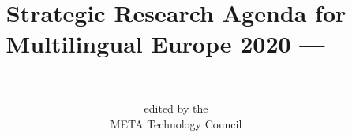 %
%
%
% 

\usepackage{polyglossia}

\title{Strategic Research Agenda for Multilingual Europe 2020 --- ~}


\subtitle{~ --- ~}

\author{
  {\footnotesize edited by the}\\
  META Technology Council
}


\editors{
}

\SpineLText{%
}

\SpineRText{%
}

